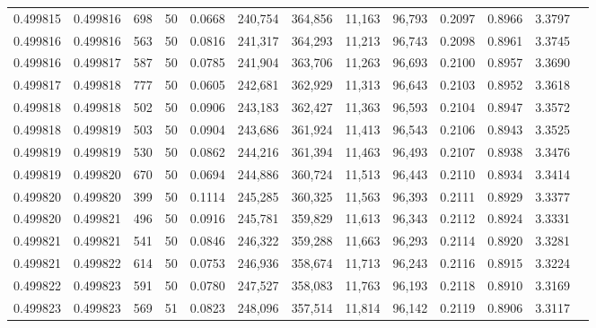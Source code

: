\begin{tabular}{rrrrrrrrrrrrr}
0.499815 & 0.499816 &   698 &  50 &                                     0.0668 & 240,754 & 364,856 &  11,163 &  96,793 & 0.2097 & 0.8966 & 3.3797 \\
0.499816 & 0.499816 &   563 &  50 &                                     0.0816 & 241,317 & 364,293 &  11,213 &  96,743 & 0.2098 & 0.8961 & 3.3745 \\
0.499816 & 0.499817 &   587 &  50 &                                     0.0785 & 241,904 & 363,706 &  11,263 &  96,693 & 0.2100 & 0.8957 & 3.3690 \\
0.499817 & 0.499818 &   777 &  50 &                                     0.0605 & 242,681 & 362,929 &  11,313 &  96,643 & 0.2103 & 0.8952 & 3.3618 \\
0.499818 & 0.499818 &   502 &  50 &                                     0.0906 & 243,183 & 362,427 &  11,363 &  96,593 & 0.2104 & 0.8947 & 3.3572 \\
0.499818 & 0.499819 &   503 &  50 &                                     0.0904 & 243,686 & 361,924 &  11,413 &  96,543 & 0.2106 & 0.8943 & 3.3525 \\
0.499819 & 0.499819 &   530 &  50 &                                     0.0862 & 244,216 & 361,394 &  11,463 &  96,493 & 0.2107 & 0.8938 & 3.3476 \\
0.499819 & 0.499820 &   670 &  50 &                                     0.0694 & 244,886 & 360,724 &  11,513 &  96,443 & 0.2110 & 0.8934 & 3.3414 \\
0.499820 & 0.499820 &   399 &  50 &                                     0.1114 & 245,285 & 360,325 &  11,563 &  96,393 & 0.2111 & 0.8929 & 3.3377 \\
0.499820 & 0.499821 &   496 &  50 &                                     0.0916 & 245,781 & 359,829 &  11,613 &  96,343 & 0.2112 & 0.8924 & 3.3331 \\
0.499821 & 0.499821 &   541 &  50 &                                     0.0846 & 246,322 & 359,288 &  11,663 &  96,293 & 0.2114 & 0.8920 & 3.3281 \\
0.499821 & 0.499822 &   614 &  50 &                                     0.0753 & 246,936 & 358,674 &  11,713 &  96,243 & 0.2116 & 0.8915 & 3.3224 \\
0.499822 & 0.499823 &   591 &  50 &                                     0.0780 & 247,527 & 358,083 &  11,763 &  96,193 & 0.2118 & 0.8910 & 3.3169 \\
0.499823 & 0.499823 &   569 &  51 &                                     0.0823 & 248,096 & 357,514 &  11,814 &  96,142 & 0.2119 & 0.8906 & 3.3117 \\

\end{tabular}
